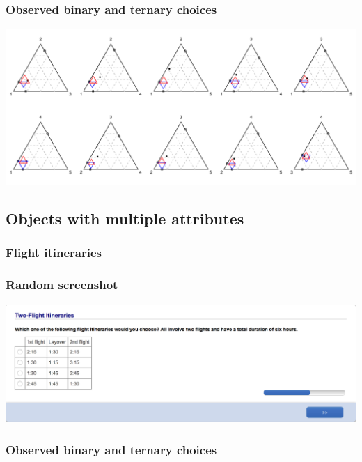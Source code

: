 \documentclass[11pt,letter]{article}
\begin{document}
\subsubsection*{Observed binary and ternary choices}

\includegraphics[width=15cm]{./Population_study_data/Simplexes/Hotel_rooms.pdf}

\pagebreak

\subsection{Objects with multiple attributes}

\subsubsection{Flight itineraries}



\subsubsection*{Random screenshot}

\includegraphics[width=15cm]{Population_study_design/screenshot_Two-Flight_Itineraries.png}

\subsubsection*{Observed binary and ternary choices}
\end{document}
